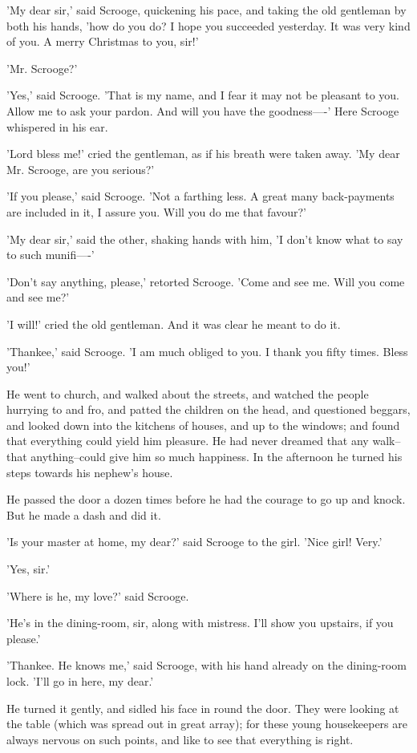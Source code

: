 'My dear sir,' said Scrooge, quickening his pace, and taking the old
gentleman by both his hands, 'how do you do? I hope you succeeded
yesterday. It was very kind of you. A merry Christmas to you, sir!'

'Mr. Scrooge?'

'Yes,' said Scrooge. 'That is my name, and I fear it may not be pleasant
to you. Allow me to ask your pardon. And will you have the goodness----'
Here Scrooge whispered in his ear.

'Lord bless me!' cried the gentleman, as if his breath were taken away.
'My dear Mr. Scrooge, are you serious?'

'If you please,' said Scrooge. 'Not a farthing less. A great many
back-payments are included in it, I assure you. Will you do me that
favour?'

'My dear sir,' said the other, shaking hands with him, 'I don't know
what to say to such munifi----'

'Don't say anything, please,' retorted Scrooge. 'Come and see me. Will
you come and see me?'

'I will!' cried the old gentleman. And it was clear he meant to do it.

'Thankee,' said Scrooge. 'I am much obliged to you. I thank you fifty
times. Bless you!'

He went to church, and walked about the streets, and watched the people
hurrying to and fro, and patted the children on the head, and questioned
beggars, and looked down into the kitchens of houses, and up to the
windows; and found that everything could yield him pleasure. He had
never dreamed that any walk--that anything--could give him so much
happiness. In the afternoon he turned his steps towards his nephew's
house.

He passed the door a dozen times before he had the courage to go up and
knock. But he made a dash and did it.

'Is your master at home, my dear?' said Scrooge to the girl. 'Nice girl!
Very.'

'Yes, sir.'

'Where is he, my love?' said Scrooge.

'He's in the dining-room, sir, along with mistress. I'll show you
upstairs, if you please.'

'Thankee. He knows me,' said Scrooge, with his hand already on the
dining-room lock. 'I'll go in here, my dear.'

He turned it gently, and sidled his face in round the door. They were
looking at the table (which was spread out in great array); for these
young housekeepers are always nervous on such points, and like to see
that everything is right.

